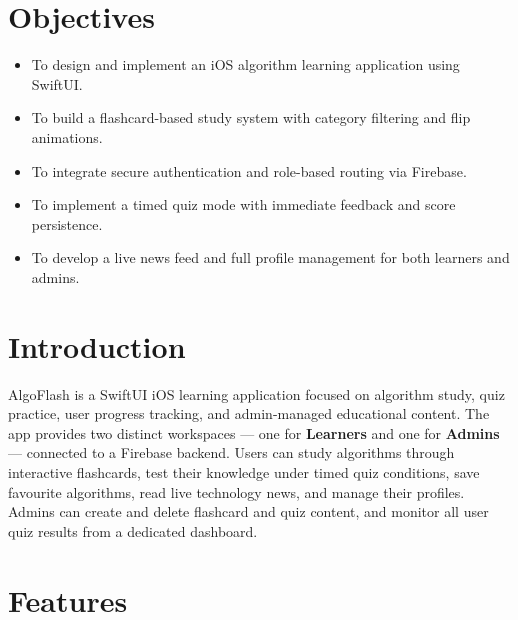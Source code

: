 \documentclass[12pt,a4paper]{article}
\begin{document}
\section*{Objectives}

\begin{itemize}[leftmargin=1.5em, itemsep=3pt]
  \item To design and implement an iOS algorithm learning application using SwiftUI.
  \item To build a flashcard-based study system with category filtering and flip animations.
  \item To integrate secure authentication and role-based routing via Firebase.
  \item To implement a timed quiz mode with immediate feedback and score persistence.
  \item To develop a live news feed and full profile management for both learners and admins.
\end{itemize}

\section*{Introduction}

AlgoFlash is a SwiftUI iOS learning application focused on algorithm study, quiz practice,
user progress tracking, and admin-managed educational content. The app provides two distinct
workspaces --- one for \textbf{Learners} and one for \textbf{Admins} --- connected to a
Firebase backend. Users can study algorithms through interactive flashcards, test their
knowledge under timed quiz conditions, save favourite algorithms, read live technology news,
and manage their profiles. Admins can create and delete flashcard and quiz content, and
monitor all user quiz results from a dedicated dashboard.

\section*{Features}
\end{document}
